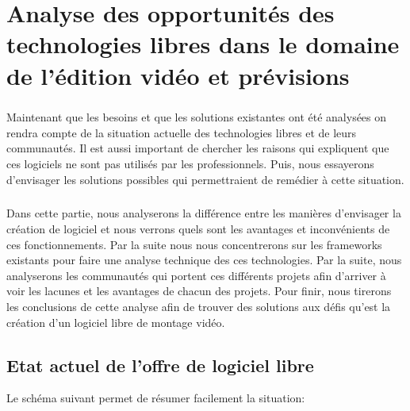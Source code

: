 \chapter{Analyse des opportunités des technologies libres dans le
domaine de l'édition vidéo et prévisions}

\minitoc \newpage

\paragraph{}

Maintenant que les besoins et que les solutions existantes ont été
analysées on rendra compte de la situation actuelle des technologies
libres et de leurs communautés. Il est aussi important de chercher les
raisons qui expliquent que ces logiciels ne sont pas utilisés par les
professionnels. Puis, nous essayerons d'envisager les solutions possibles
qui permettraient de remédier à cette situation.

\paragraph{}

Dans cette partie, nous analyserons la différence entre les manières
d'envisager la création de logiciel et nous verrons quels sont les
avantages et inconvénients de ces fonctionnements. Par la suite nous
nous concentrerons sur les frameworks existants pour faire une analyse
technique des ces technologies. Par la suite, nous analyserons les
communautés qui portent ces différents projets afin d'arriver à voir
les lacunes et les avantages de chacun des projets.  Pour finir, nous
tirerons les conclusions de cette analyse afin de trouver des solutions
aux défis qu'est la création d'un logiciel libre de montage vidéo.

\newpage

\section {Etat actuel de l'offre de logiciel libre}

Le schéma suivant permet de résumer facilement la situation:

